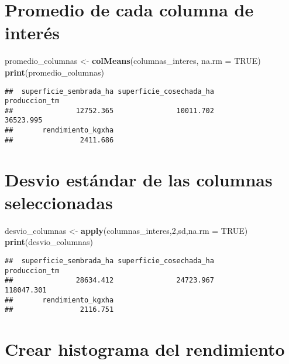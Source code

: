 \documentclass[
]{article}
\newenvironment{Shaded}{\begin{snugshade}}{\end{snugshade}}
\newcommand{\AttributeTok}[1]{\textcolor[rgb]{0.13,0.29,0.53}{#1}}
\newcommand{\ConstantTok}[1]{\textcolor[rgb]{0.56,0.35,0.01}{#1}}
\newcommand{\DecValTok}[1]{\textcolor[rgb]{0.00,0.00,0.81}{#1}}
\newcommand{\FunctionTok}[1]{\textcolor[rgb]{0.13,0.29,0.53}{\textbf{#1}}}
\newcommand{\NormalTok}[1]{#1}
\newcommand{\OtherTok}[1]{\textcolor[rgb]{0.56,0.35,0.01}{#1}}
\begin{document}
\hypertarget{promedio-de-cada-columna-de-interuxe9s}{%
\section{Promedio de cada columna de
interés}\label{promedio-de-cada-columna-de-interuxe9s}}

\begin{Shaded}
\begin{Highlighting}[]
\NormalTok{promedio\_columnas }\OtherTok{\textless{}{-}} \FunctionTok{colMeans}\NormalTok{(columnas\_interes, }\AttributeTok{na.rm =} \ConstantTok{TRUE}\NormalTok{)}
\FunctionTok{print}\NormalTok{(promedio\_columnas)}
\end{Highlighting}
\end{Shaded}

\begin{verbatim}
##  superficie_sembrada_ha superficie_cosechada_ha           produccion_tm 
##               12752.365               10011.702               36523.995 
##       rendimiento_kgxha 
##                2411.686
\end{verbatim}

\hypertarget{desvio-estuxe1ndar-de-las-columnas-seleccionadas}{%
\section{Desvio estándar de las columnas
seleccionadas}\label{desvio-estuxe1ndar-de-las-columnas-seleccionadas}}

\begin{Shaded}
\begin{Highlighting}[]
\NormalTok{desvio\_columnas }\OtherTok{\textless{}{-}} \FunctionTok{apply}\NormalTok{(columnas\_interes,}\DecValTok{2}\NormalTok{,sd,}\AttributeTok{na.rm =} \ConstantTok{TRUE}\NormalTok{)}
\FunctionTok{print}\NormalTok{(desvio\_columnas)}
\end{Highlighting}
\end{Shaded}

\begin{verbatim}
##  superficie_sembrada_ha superficie_cosechada_ha           produccion_tm 
##               28634.412               24723.967              118047.301 
##       rendimiento_kgxha 
##                2116.751
\end{verbatim}

\hypertarget{crear-histograma-del-rendimiento}{%
\section{Crear histograma del
rendimiento}\label{crear-histograma-del-rendimiento}}
\end{document}
